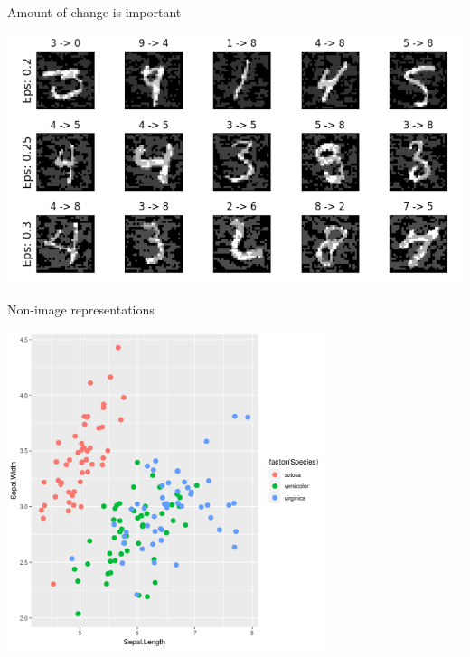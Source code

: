 \documentclass[smaller]{beamer}
\begin{document}
\begin{frame}[label={sec:orgf39bfe0}]{Amount of change is important}
\begin{center}
\includegraphics[width=.9\linewidth]{images/eos.png}
\end{center}
\end{frame}

\begin{frame}[label={sec:org7c9eb37}]{Non-image representations}
\begin{center}
\includegraphics[width=0.7\textwidth]{images/iris.png}
\end{center}
\end{frame}
\end{document}
